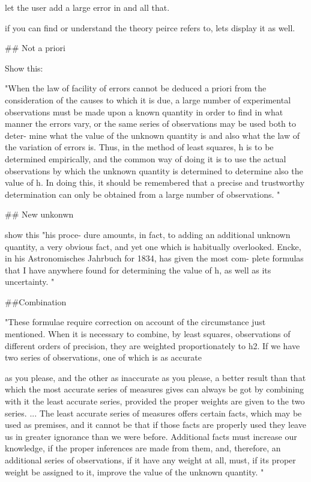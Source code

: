 let the user add a large error in and all that. 

if you can find or understand the theory peirce refers to, lets display it as well. 

## Not a priori

Show this:

"When the law of facility of errors cannot be deduced a priori from the consideration of the causes to which it is due, a large number of experimental observations must be made upon a known quantity in order to find in what manner the errors vary, or the same series of observations may be used both to deter- mine what the value of the unknown quantity is and also what the law of the variation of errors is. Thus, in the method of least squares, h is to be determined empirically, and the common way of doing it is to use the actual observations by which the unknown quantity is determined to determine also the value of h. In doing this, it should be remembered that a precise and trustworthy determination can only be obtained from a large number of observations. "

## New unkonwn

show this "his proce- dure amounts, in fact, to adding an additional unknown quantity, a very obvious fact, and yet one which is habitually overlooked. Encke, in his Astronomisches Jahrbuch for 1834, has given the most com- plete formulas that I have anywhere found for determining the value of h, as well as its uncertainty. "

##Combination

"These formulae require correction on account of the circumstance just mentioned. When it is necessary to combine, by least squares, observations of different orders of precision, they are weighted proportionately to h2. If we have two series of observations, one of which is as accurate

as you please, and the other as inaccurate as you please, a better result than that which the most accurate series of measures gives can always be got by combining with it the least accurate series, provided the proper weights are given to the two series. ... The least accurate series of measures offers certain facts, which may be used as premises, and it cannot be that if those facts are properly used they leave us in greater ignorance than we were before. Additional facts must increase our knowledge, if the proper inferences are made from them, and, therefore, an additional series of observations, if it have any weight at all, must, if its proper weight be assigned to it, improve the value of the unknown quantity. "

